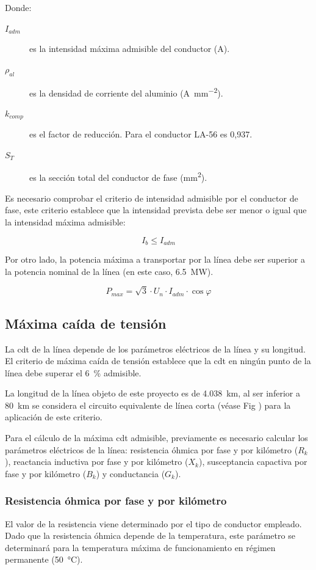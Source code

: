 Donde:
\begin{description}
  \item[$I_{adm}$] es la intensidad máxima admisible del conductor (\si{\ampere}).
  \item[$\rho_{al}$] es la densidad de corriente del aluminio (\si{\ampere\per\milli\meter\squared}).
  \item[$k_{comp}$] es el factor de reducción. Para el conductor LA-56 es 0,937.
  \item[$S_T$] es la sección total del conductor de fase (\si{\milli\meter\squared}).
\end{description}
Es necesario comprobar el criterio de intensidad admisible por el conductor de fase, este criterio establece que la intensidad prevista debe ser menor o igual que la intensidad máxima admisible:

\begin{equation}
\label{eq:criterio-Iadm}
I_b \leq I_{adm}
\end{equation}

Por otro lado, la potencia máxima a transportar por la línea debe ser superior a la potencia nominal de la línea (en este caso, \SI{6.5}{\mega\watt}).

\begin{equation}
\label{eq:potencia-maxima}
P_{max} = \sqrt{3} \cdot U_n \cdot I_{adm} \cdot \cos\varphi
\end{equation}

\subsection{Máxima caída de tensión}
\label{subsec:ce-cdt}
La \ac{cdt} de la línea depende de los parámetros eléctricos de la línea y su longitud. El criterio de máxima caída de tensión establece que la \ac{cdt} en ningún punto de la línea debe superar el \SI{6}{\percent} admisible.

La longitud de la línea objeto de este proyecto es de \SI{4.038}{\kilo\meter}, al ser inferior a \SI{80}{\kilo\meter} se considera el circuito equivalente de línea corta (véase Fig ) para la aplicación de este criterio.

Para el cálculo de la máxima \ac{cdt} admisible, previamente es necesario calcular los parámetros eléctricos de la línea: resistencia óhmica por fase y por kilómetro ($R_k$), reactancia inductiva por fase y por kilómetro ($X_k$), susceptancia capactiva por fase y por kilómetro ($B_k$) y conductancia ($G_k$).

\subsubsection{Resistencia óhmica por fase y por kilómetro}
\label{subsubsec:cdt-resistencia}
El valor de la resistencia viene determinado por el tipo de conductor empleado. Dado que la resistencia óhmica depende de la temperatura, este parámetro se determinará para la temperatura máxima de funcionamiento en régimen permanente (\SI{50}{\celsius}).

